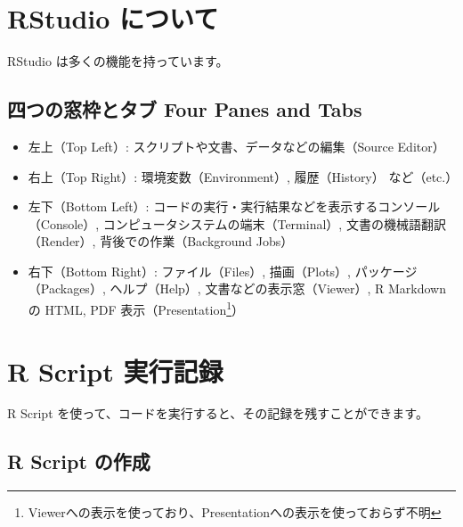 \documentclass[
  xelatex, ja=standard]{bxjsbook}
\providecommand{\tightlist}{%
  \setlength{\itemsep}{0pt}\setlength{\parskip}{0pt}}
\theoremstyle{definition}
\theoremstyle{definition}
\theoremstyle{definition}
\theoremstyle{definition}
\theoremstyle{remark}
\begin{document}
\hypertarget{rstudio-ux306bux3064ux3044ux3066}{%
\section{RStudio について}\label{rstudio-ux306bux3064ux3044ux3066}}

RStudio は多くの機能を持っています。

\hypertarget{ux56dbux3064ux306eux7a93ux67a0ux3068ux30bfux30d6-four-panes-and-tabs}{%
\subsection{四つの窓枠とタブ Four Panes and Tabs}\label{ux56dbux3064ux306eux7a93ux67a0ux3068ux30bfux30d6-four-panes-and-tabs}}

\begin{itemize}
\tightlist
\item
  左上（Top Left）: スクリプトや文書、データなどの編集（Source Editor）
\item
  右上（Top Right）: 環境変数（Environment）, 履歴（History） など（etc.）
\item
  左下（Bottom Left）: コードの実行・実行結果などを表示するコンソール（Console）, コンピュータシステムの端末（Terminal）, 文書の機械語翻訳（Render）, 背後での作業（Background Jobs）
\item
  右下（Bottom Right）: ファイル（Files）, 描画（Plots）, パッケージ（Packages）, ヘルプ（Help）, 文書などの表示窓（Viewer）, R Markdown の HTML, PDF 表示（Presentation\footnote{Viewerへの表示を使っており、Presentationへの表示を使っておらず不明}）
\end{itemize}

\hypertarget{r-script-ux5b9fux884cux8a18ux9332}{%
\section{R Script 実行記録}\label{r-script-ux5b9fux884cux8a18ux9332}}

R Script を使って、コードを実行すると、その記録を残すことができます。

\hypertarget{r-script-ux306eux4f5cux6210}{%
\subsection{R Script の作成}\label{r-script-ux306eux4f5cux6210}}
\end{document}
